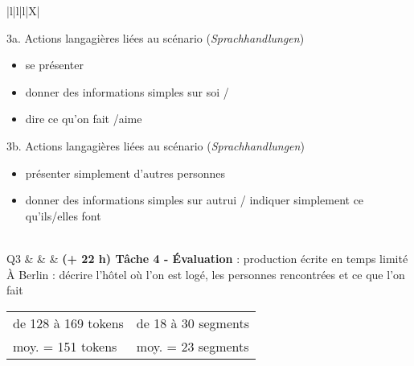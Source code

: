 \documentclass[output=paper]{langscibook}
\begin{document}
\begin{otherlanguage}{french}
\begin{table}
\begin{tabularx}{\textwidth}{|l|l|l|X|}
		 
		
		3a. Actions langagières liées au scénario (\textit{Sprachhandlungen})
		\begin{itemize}[noitemsep,nosep]
		\item se présenter
		\item donner des informations simples sur soi / 
		\item dire ce qu’on fait /aime
		\end{itemize}
		
		3b. Actions langagières liées au scénario (\textit{Sprachhandlungen})
		\begin{itemize}[nosep,noitemsep,after=\vspace*{-\baselineskip}]
		\item présenter simplement d’autres personnes
		\item donner des informations simples sur autrui / indiquer simplement ce qu’ils/elles font
		\end{itemize}\\\hhline{--~-}
		Q3 &  & & \textbf{(+ 22 h) 	Tâche 4	 - Évaluation} : production écrite en temps limité\newline
		   À Berlin : décrire l’hôtel où l’on est logé, les personnes rencontrées et ce que l’on fait\newline
           \begin{center}\vspace*{-2\baselineskip}
           \begin{tabular}{|ll|}
           \hline
           de 128 à 169 tokens  &  de 18 à 30 segments \\
           moy. = 151 tokens     &  moy. = 23 segments  \\            
           \hline
           \end{tabular}
           \end{center}


\end{tabularx}
\end{table}
\end{otherlanguage}
\end{document}
